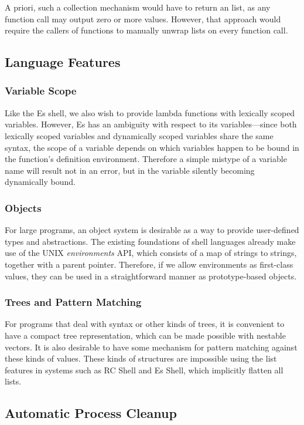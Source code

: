 \documentclass[english,PRO]{ipsj}
\begin{document}
A priori, such a collection mechanism would have to return an list, as any function call may output zero or more values. However, that approach would require the callers of functions to manually unwrap lists on every function call.

\subsection{Language Features}
\subsubsection{Variable Scope}\noindent
Like the Es shell, we also wish to provide lambda functions with lexically scoped variables. However, Es has an ambiguity with respect to its variables---since both lexically scoped variables and dynamically scoped variables share the same syntax, the scope of a variable depends on which variables happen to be bound in the function's definition environment. Therefore a simple mistype of a variable name will result not in an error, but in the variable silently becoming dynamically bound.

\subsubsection{Objects}\noindent
For large programs, an object system is desirable as a way to provide user-defined types and abstractions. The existing foundations of shell languages already make use of the UNIX \emph{environments} API, which consists of a map of strings to strings, together with a parent pointer. Therefore, if we allow environments as first-class values, they can be used in a straightforward manner as prototype-based objects.

\subsubsection{Trees and Pattern Matching}\noindent
For programs that deal with syntax or other kinds of trees, it is convenient to have a compact tree representation, which can be made possible with nestable vectors. It is also desirable to have some mechanism for pattern matching against these kinds of values. These kinds of structures are impossible using the list features in systems such as RC Shell\cite{duff} and Es Shell, which implicitly flatten all lists.

\subsection{Automatic Process Cleanup}
\end{document}
